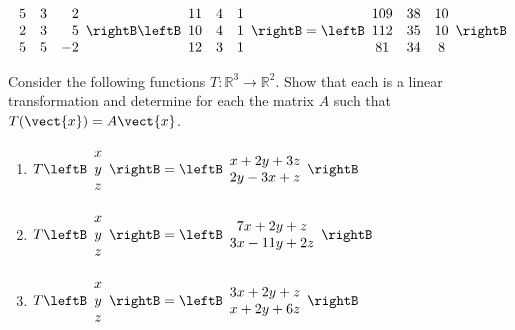\begin{enumialphparenastyle}
\begin{ex}
\begin{sol}
\[\begin{array}{rrr}
5 & 3 & 2 \\
2 & 3 & 5 \\
5 & 5 & -2
\end{array}
\rightB \leftB
\begin{array}{ccc}
11 & 4 & 1 \\
10 & 4 & 1 \\
12 & 3 & 1
\end{array}
\rightB =\leftB
\begin{array}{ccc}
109 & 38 & 10 \\
112 & 35 & 10 \\
81 & 34 & 8
\end{array}
\rightB
\]
\end{sol}
\end{ex}


\begin{ex} Consider the following functions $T:\mathbb{R}^{3}\rightarrow \mathbb{R}^{2}$.
Show that each is a linear transformation and determine for each the matrix $A$ such that 
$T(\vect{x})=A\vect{x}$.

\begin{enumerate}
\item $T\leftB
\begin{array}{c}
x \\
y \\
z
\end{array}
\rightB =\leftB
\begin{array}{c}
x+2y+3z \\
2y-3x+z
\end{array}
\rightB $

\item $T\leftB
\begin{array}{c}
x \\
y \\
z
\end{array}
\rightB =\leftB
\begin{array}{c}
7x+2y+z \\
3x-11y+2z
\end{array}
\rightB $

\item $T\leftB
\begin{array}{c}
x \\
y \\
z
\end{array}
\rightB =\leftB
\begin{array}{c}
3x+2y+z \\
x+2y+6z
\end{array}
\rightB $


\end{enumerate}
\end{ex}
\end{enumialphparenastyle}

